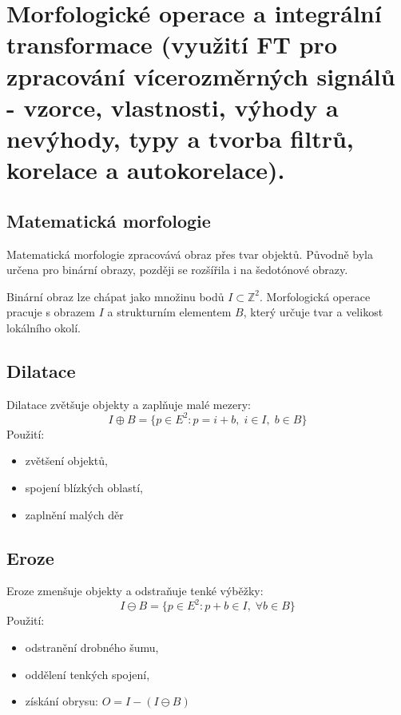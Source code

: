 \newpage

\section{Morfologické operace a integrální transformace (využití FT pro zpracování vícerozměrných signálů - vzorce,
vlastnosti, výhody a nevýhody, typy a tvorba filtrů, korelace a autokorelace).}

\subsection*{Matematická morfologie}
Matematická morfologie zpracovává obraz přes tvar objektů. Původně byla určena pro binární obrazy,
později se rozšířila i na šedotónové obrazy.

Binární obraz lze chápat jako množinu bodů \(I \subset \mathbb{Z}^2\).
Morfologická operace pracuje s obrazem \(I\) a strukturním elementem \(B\), který určuje tvar a velikost lokálního okolí.

\subsection*{Dilatace}
Dilatace zvětšuje objekty a zaplňuje malé mezery:
\begin{equation}
    I\oplus B=\{p\in E^2: p=i+b,\; i\in I,\; b\in B\}
\end{equation}
Použití:
\begin{itemize}
    \item zvětšení objektů,
    \item spojení blízkých oblastí,
    \item zaplnění malých děr
\end{itemize}

\subsection*{Eroze}
Eroze zmenšuje objekty a odstraňuje tenké výběžky:
\begin{equation}
    I\ominus B=\{p\in E^2: p+b\in I,\; \forall b\in B\}
\end{equation}
Použití:
\begin{itemize}
    \item odstranění drobného šumu,
    \item oddělení tenkých spojení,
    \item získání obrysu: \(O=I-(I\ominus B)\)
\end{itemize}

